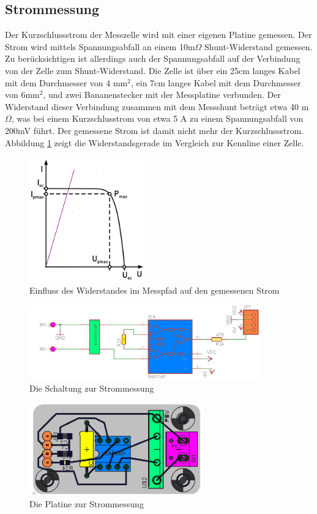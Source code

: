 \documentclass[a4paper,bibtotoc,oneside]{scrbook}
\begin{document}
\subsection{Strommessung}\thispagestyle{empty}
Der Kurzschlussstrom der Messzelle wird mit einer eigenen Platine gemessen. Der Strom wird mittels Spannungsabfall an einem 10m$\Omega$ Shunt-Widerstand gemessen. Zu berücksichtigen ist allerdings auch der Spannungsabfall auf der Verbindung von der Zelle zum Shunt-Widerstand.
Die Zelle ist über ein 25cm langes Kabel mit dem Durchmesser von 4 mm$^2$, ein 7cm langes Kabel mit dem Durchmesser von 6mm$^2$, und zwei Bananenstecker mit der Messplatine verbunden. Der Widerstand dieser Verbindung zusammen mit dem Messshunt beträgt etwa 40 m$\Omega$, was bei einem Kurzschlusstrom von etwa 5 A zu einem Spannungsabfall von 200mV führt. Der gemessene Strom ist damit nicht mehr der Kurzschlussstrom. Abbildung \ref{kenn2} zeigt die Widerstandsgerade im Vergleich zur Kennline einer Zelle.

\begin{figure}[htbp]
\centering
\includegraphics[width=50mm]{img/kenn2.png}
\caption{Einfluss des Widerstandes im Messpfad auf den gemessenen Strom}\label{kenn2}
\end{figure}

\begin{figure}[htbp]
\centering
\includegraphics[width=100mm]{img/i1.png}
\caption{Die Schaltung zur Strommessung}\label{i1}
\end{figure}

\begin{figure}[htbp]
\centering
\includegraphics[width=75mm]{img/i2.png}
\caption{Die Platine zur Strommessung}\label{i2}
\end{figure}
\end{document}
